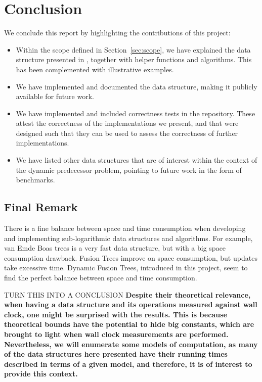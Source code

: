 \chapter{Conclusion} \label{sec:conclusionChapter}

We conclude this report by highlighting the contributions of this project:
\begin{itemize}
    \item
    Within the scope defined in Section~\ref{sec:scope}, we have explained the data structure presented in \cite{patrascu2014dynamic}, together with helper functions and algorithms. This has been complemented with illustrative examples.
    
    \item
    We have implemented and documented the data structure, making it publicly available for future work.
    
    \item
    We have implemented and included correctness tests in the repository. These attest the correctness of the implementations we present, and that were designed such that they can be used to assess the correctness of further implementations.
    
    \item
    We have listed other data structures that are of interest within the context of the dynamic predecessor problem, pointing to future work in the form of benchmarks.
\end{itemize}

\section{Final Remark}

There is a fine balance between space and time consumption when developing and implementing sub-logarithmic data structures and algorithms. For example, van Emde Boas trees is a very fast data structure, but with a big space consumption drawback. Fusion Trees improve on space consumption, but updates take excessive time. Dynamic Fusion Trees, introduced in this project, seem to find the perfect balance between space and time consumption.

TURN THIS INTO A CONCLUSION
\textbf{Despite their theoretical relevance, when having a data structure and its operations measured against wall clock, one might be surprised with the results.
This is because theoretical bounds have the potential to hide big constants, which are brought to light when wall clock measurements are performed.
Nevertheless, we will enumerate some models of computation, as many of the data structures here presented have their running times described in terms of a given model, and therefore, it is of interest to provide this context.}

